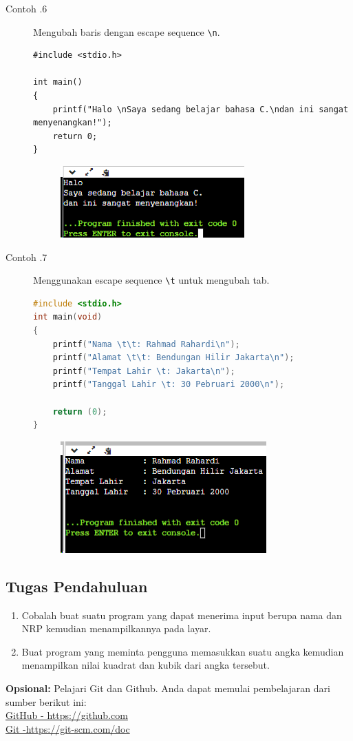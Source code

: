\begin{description}
	\item[Contoh \thesubsection.6] Mengubah baris dengan escape sequence \verb*|\n|.
		\begin{lstlisting}
#include <stdio.h>

int main() 
{
	printf("Halo \nSaya sedang belajar bahasa C.\ndan ini sangat menyenangkan!");
	return 0;
}
	\end{lstlisting}
		\begin{figure}[H]
			\centering
			\includegraphics[width=0.5\linewidth]{P1/img/screenshot0006.png}
			\caption{}
			\label{fig:screenshot0006}
		\end{figure}

	\item[Contoh \thesubsection.7] Menggunakan escape sequence \verb*|\t| untuk mengubah tab.
		\begin{lstlisting}[language=c]
#include <stdio.h>
int main(void)
{
	printf("Nama \t\t: Rahmad Rahardi\n");
	printf("Alamat \t\t: Bendungan Hilir Jakarta\n");
	printf("Tempat Lahir \t: Jakarta\n");
	printf("Tanggal Lahir \t: 30 Pebruari 2000\n");
	
	return (0);
}
\end{lstlisting}
		\begin{figure}[H]
			\centering
			\includegraphics[width=0.5\linewidth]{P1/img/screenshot0007.png}
			\caption{}
			\label{fig:screenshot0007}
		\end{figure}
\end{description}

\subsection{Tugas Pendahuluan}
\begin{enumerate}
	\item Cobalah buat suatu program yang dapat menerima input berupa nama dan NRP kemudian menampilkannya pada layar.
	\item Buat program yang meminta pengguna memasukkan suatu angka kemudian menampilkan nilai kuadrat dan kubik dari angka tersebut.
\end{enumerate}


\begin{center}
	\colorbox{cyan!30}{\parbox{0.8\linewidth}{\textbf{Opsional:} Pelajari Git dan Github. Anda dapat memulai pembelajaran dari sumber berikut ini: \\ \href{https://github.com}{GitHub - https://github.com} \\ \href{https://git-scm.com/doc}{Git -https://git-scm.com/doc}}}
\end{center}